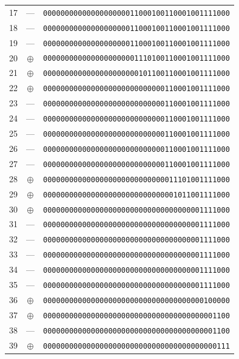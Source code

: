 \documentclass[11pt,a4paper]{article}
\begin{document}
\begin{center}
\begin{tabular}{rcl}
    17 & --- & \texttt{0000000000000000000011000100110001001111000} \\
    18 & --- & \texttt{0000000000000000000011000100110001001111000} \\
    19 & --- & \texttt{0000000000000000000011000100110001001111000} \\
    20 & $\oplus$ & \texttt{0000000000000000000001110100110001001111000} \\
    21 & $\oplus$ & \texttt{0000000000000000000000101100110001001111000} \\
    22 & $\oplus$ & \texttt{0000000000000000000000000000110001001111000} \\
    23 & --- & \texttt{0000000000000000000000000000110001001111000} \\
    24 & --- & \texttt{0000000000000000000000000000110001001111000} \\
    25 & --- & \texttt{0000000000000000000000000000110001001111000} \\
    26 & --- & \texttt{0000000000000000000000000000110001001111000} \\
    27 & --- & \texttt{0000000000000000000000000000110001001111000} \\
    28 & $\oplus$ & \texttt{0000000000000000000000000000011101001111000} \\
    29 & $\oplus$ & \texttt{0000000000000000000000000000001011001111000} \\
    30 & $\oplus$ & \texttt{0000000000000000000000000000000000001111000} \\
    31 & --- & \texttt{0000000000000000000000000000000000001111000} \\
    32 & --- & \texttt{0000000000000000000000000000000000001111000} \\
    33 & --- & \texttt{0000000000000000000000000000000000001111000} \\
    34 & --- & \texttt{0000000000000000000000000000000000001111000} \\
    35 & --- & \texttt{0000000000000000000000000000000000001111000} \\
    36 & $\oplus$ & \texttt{0000000000000000000000000000000000000100000} \\
    37 & $\oplus$ & \texttt{0000000000000000000000000000000000000001100} \\
    38 & --- & \texttt{0000000000000000000000000000000000000001100} \\
    39 & $\oplus$ & \texttt{0000000000000000000000000000000000000000111} \\
\bottomrule
\end{tabular}
\end{center}
\end{document}
